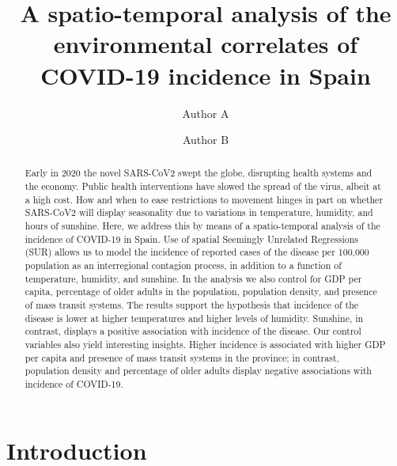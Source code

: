 \documentclass[]{elsarticle} %
\begin{document}
\begin{frontmatter}

  \title{A spatio-temporal analysis of the environmental correlates of COVID-19
incidence in Spain}
    \author[Some School]{Author A}
    \author[Some Institute]{Author B}
      \address[Some School]{School of the Things}
    \address[Some Institute]{Institute of Everything}
    \address[Departamento de Economia]{}
  
  \begin{abstract}
  Early in 2020 the novel SARS-CoV2 swept the globe, disrupting health
  systems and the economy. Public health interventions have slowed the
  spread of the virus, albeit at a high cost. How and when to ease
  restrictions to movement hinges in part on whether SARS-CoV2 will
  display seasonality due to variations in temperature, humidity, and
  hours of sunshine. Here, we address this by means of a spatio-temporal
  analysis of the incidence of COVID-19 in Spain. Use of spatial Seemingly
  Unrelated Regressions (SUR) allows us to model the incidence of reported
  cases of the disease per 100,000 population as an interregional
  contagion process, in addition to a function of temperature, humidity,
  and sunshine. In the analysis we also control for GDP per capita,
  percentage of older adults in the population, population density, and
  presence of mass transit systems. The results support the hypothesis
  that incidence of the disease is lower at higher temperatures and higher
  levels of humidity. Sunshine, in contrast, displays a positive
  association with incidence of the disease. Our control variables also
  yield interesting insights. Higher incidence is associated with higher
  GDP per capita and presence of mass transit systems in the province; in
  contrast, population density and percentage of older adults display
  negative associations with incidence of COVID-19.
  \end{abstract}
  
 \end{frontmatter}

\hypertarget{introduction}{%
\section{Introduction}\label{introduction}}
\end{document}
